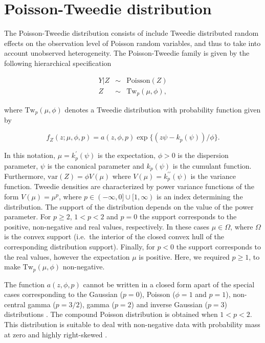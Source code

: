 \documentclass[9pt,a5paper,]{book}
\theoremstyle{definition}
\theoremstyle{definition}
\theoremstyle{remark}
\begin{document}
\section{Poisson-Tweedie distribution}\label{ptw}

The Poisson-Tweedie distribution
\citep{Bonat2016b, Jorgensen2014, Shaarawi2011} consists of include
Tweedie distributed random effects on the observation level of Poisson
random variables, and thus to take into account unobserved
heterogeneity. The Poisson-Tweedie family is given by the following
hierarchical specification

\begin{eqnarray}
Y|Z &\sim& \mathrm{Poisson}(Z) \\ 
Z &\sim& \mathrm{Tw}_p(\mu, \phi), \nonumber
\label{eq:conditional}
\end{eqnarray}

where \(\mathrm{Tw}_p(\mu, \phi)\) denotes a Tweedie distribution
\citetext{\citealp[ ]{Jorgensen1987}; \citealp{Jorgensen1997}} with
probability function given by

\begin{equation}
f_{Z}(z; \mu, \phi, p) = a(z,\phi,p) \exp\{(z\psi - k_p(\psi))/\phi\}.
\label{eq:tweedie}
\end{equation}

In this notation, \(\mu = k^{\prime}_p(\psi)\) is the expectation,
\(\phi > 0\) is the dispersion parameter, \(\psi\) is the canonical
parameter and \(k_p(\psi)\) is the cumulant function. Furthermore,
\(\mathrm{var}(Z) = \phi V(\mu)\) where
\(V(\mu) = k^{\prime \prime}_p(\psi)\) is the variance function. Tweedie
densities are characterized by power variance functions of the form
\(V(\mu) = \mu^p\), where \(p \in (-\infty ,0] \cup [1,\infty)\) is an
index determining the distribution. The support of the distribution
depends on the value of the power parameter. For \(p \geq 2\),
\(1 < p < 2\) and \(p = 0\) the support corresponds to the positive,
non-negative and real values, respectively. In these cases
\(\mu \in \Omega\), where \(\Omega\) is the convex support (i.e.~the
interior of the closed convex hull of the corresponding distribution
support). Finally, for \(p < 0\) the support corresponds to the real
values, however the expectation \(\mu\) is positive. Here, we required
\(p \geq 1\), to make \(\mathrm{Tw}_p(\mu, \phi)\) non-negative.

The function \(a(z,\phi, p)\) cannot be written in a closed form apart
of the special cases corresponding to the Gaussian (\(p = 0\)), Poisson
(\(\phi = 1\) and \(p = 1\)), non-central gamma (\(p = 3/2\)), gamma
(\(p = 2\)) and inverse Gaussian (\(p = 3\)) distributions
\citep{Jorgensen1997}. The compound Poisson distribution is obtained
when \(1 < p < 2\). This distribution is suitable to deal with
non-negative data with probability mass at zero and highly right-skewed
\citep{Andersen2016}.
\end{document}
